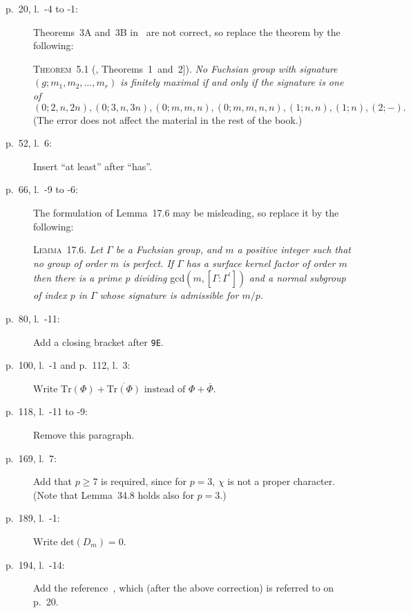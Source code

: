 \documentclass[12pt,twoside]{article}
\def\Spur{\textrm{Tr}}
\begin{document}
\begin{description}
\item[p.~20, l.~-4 to -1:]
    Theorems~3A and~3B in~\cite{Gre63} are not correct,
    so replace the theorem by the following:

    {\scshape Theorem}~5.1 (\cite{Sin72}, Theorems~1~and~2]).
    {\itshape 
    No Fuchsian group with signature $(g;m_1,m_2,\ldots,m_r)$ is finitely
    maximal if and only if the signature is one of
    \[
       (0;2,n,2n), (0;3,n,3n), (0;m,m,n), (0;m,m,n,n), (1;n,n), (1;n),
       (2;-) .
    \]}
    (The error does not affect the material in the rest of the book.)

\item[p.~52, l.~6:]
    Insert ``at least'' after ``has''.

\item[p.~66, l.~-9 to -6:]
    The formulation of Lemma~17.6 may be misleading,
    so replace it by the following:

    {\scshape Lemma}~17.6.
    {\itshape 
    Let $\Gamma$ be a Fuchsian group, and $m$ a positive integer such that
    no group of order $m$ is perfect.
    If $\Gamma$ has a surface kernel factor of order $m$ then there is
    a prime $p$ dividing} gcd$(m, [\Gamma : \Gamma^{\prime}])$
    {\itshape
    and a normal subgroup of index $p$ in $\Gamma$ whose signature
    is admissible for $m/p$.}

\item[p.~80, l.~-11:]
    Add a closing bracket after {\tt 9E}.

\item[p.~100, l.~-1 and p.~112, l.~3:]
    $\textrm{Write } \Spur(\Phi) + \overline{\Spur(\Phi)}
    \textrm{ instead of } \Phi + \overline{\Phi}$.

\item[p.~118, l.~-11 to -9:]
    Remove this paragraph.

\item[p.~169, l.~7:]
    Add that $p \geq 7$ is required,
    since for $p = 3$, $\chi$ is not a proper character.
    (Note that Lemma~34.8 holds also for $p=3$.)

\item[p.~189, l.~-1:]
    $\textrm{Write det}( D_m ) = 0$.

\item[p.~194, l.~-14:]
    Add the reference~\cite{Sin72},
    which (after the above correction) is referred to on p.~20.
\end{description}
\end{document}

